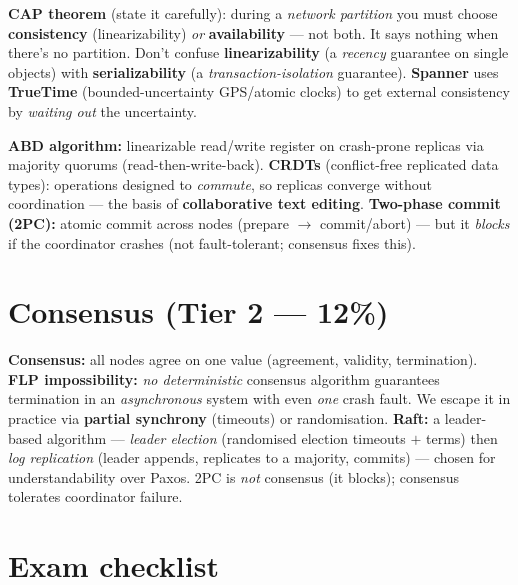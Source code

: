 \documentclass[11pt,a4paper]{article}
\begin{document}
\begin{gotcha}
\textbf{CAP theorem} (state it carefully): during a \emph{network partition} you must choose \textbf{consistency} (linearizability) \emph{or} \textbf{availability} --- not both. It says nothing when there's no partition. Don't confuse \textbf{linearizability} (a \emph{recency} guarantee on single objects) with \textbf{serializability} (a \emph{transaction-isolation} guarantee). \textbf{Spanner} uses \textbf{TrueTime} (bounded-uncertainty GPS/atomic clocks) to get external consistency by \emph{waiting out} the uncertainty.
\end{gotcha}

\begin{useful}
\textbf{ABD algorithm:} linearizable read/write register on crash-prone replicas via majority quorums (read-then-write-back). \textbf{CRDTs} (conflict-free replicated data types): operations designed to \emph{commute}, so replicas converge without coordination --- the basis of \textbf{collaborative text editing}. \textbf{Two-phase commit (2PC):} atomic commit across nodes (prepare $\to$ commit/abort) --- but it \emph{blocks} if the coordinator crashes (not fault-tolerant; consensus fixes this).
\end{useful}

\section{Consensus (Tier 2 --- 12\%)}

\begin{must}
\textbf{Consensus:} all nodes agree on one value (agreement, validity, termination). \textbf{FLP impossibility:} \emph{no deterministic} consensus algorithm guarantees termination in an \emph{asynchronous} system with even \emph{one} crash fault. We escape it in practice via \textbf{partial synchrony} (timeouts) or randomisation. \textbf{Raft:} a leader-based algorithm --- \emph{leader election} (randomised election timeouts $+$ terms) then \emph{log replication} (leader appends, replicates to a majority, commits) --- chosen for understandability over Paxos. 2PC is \emph{not} consensus (it blocks); consensus tolerates coordinator failure.
\end{must}

\section*{Exam checklist}
\end{document}
